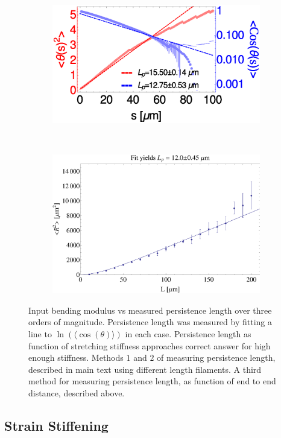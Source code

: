 \documentclass[12pt]{article} \usepackage{times} \usepackage{graphicx}
\begin{document}
\begin{figure}[H]
  \begin{subfigure}{0.6\textwidth} \centering
    \includegraphics[width=\textwidth]{figs/filament/sAvgd_L1-100.eps}
    \caption{\label{fig:lp_vs_l}} \end{subfigure} ~
  \begin{subfigure}{0.4\textwidth} \centering
    \includegraphics[width=\textwidth]{figs/filament/R2vsL.eps}
    \caption{\label{fig:R2}} \end{subfigure} \label{fig:wlc_supp} \caption{
     Input bending modulus vs measured persistence length over
    three orders of magnitude. Persistence length was measured by fitting a
    line to $\ln{(\langle \cos{(\theta)}\rangle)}$ in each case.
    Persistence length as function of stretching stiffness
    approaches correct answer for high enough stiffness.
    Methods $1$ and $2$ of measuring persistence length,
    described in main text using different length filaments.   A
    third method for measuring persistence length, as function of end to end
    distance, described above.  } \end{figure} \subsection{Strain Stiffening}
\end{document}
